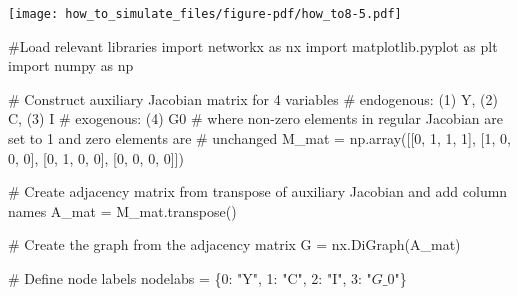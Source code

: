\documentclass[
  letterpaper,
  DIV=11,
  numbers=noendperiod]{scrreprt}
\newenvironment{Shaded}{\begin{snugshade}}{\end{snugshade}}
\newcommand{\CommentTok}[1]{\textcolor[rgb]{0.37,0.37,0.37}{#1}}
\newcommand{\DecValTok}[1]{\textcolor[rgb]{0.68,0.00,0.00}{#1}}
\newcommand{\ImportTok}[1]{\textcolor[rgb]{0.00,0.46,0.62}{#1}}
\newcommand{\NormalTok}[1]{\textcolor[rgb]{0.00,0.23,0.31}{#1}}
\newcommand{\OperatorTok}[1]{\textcolor[rgb]{0.37,0.37,0.37}{#1}}
\newcommand{\StringTok}[1]{\textcolor[rgb]{0.13,0.47,0.30}{#1}}
\begin{document}
\texttt{[image: how\_to\_simulate\_files/figure-pdf/how\_to8-5.pdf]}

\begin{tcolorbox}[enhanced jigsaw, titlerule=0mm, breakable, bottomrule=.15mm, toprule=.15mm, colbacktitle=quarto-callout-note-color!10!white, rightrule=.15mm, toptitle=1mm, opacityback=0, left=2mm, coltitle=black, title=\textcolor{quarto-callout-note-color}{\faInfo}\hspace{0.5em}{Python code}, colframe=quarto-callout-note-color-frame, opacitybacktitle=0.6, leftrule=.75mm, bottomtitle=1mm, arc=.35mm, colback=white]

\begin{Shaded}
\begin{Highlighting}[]
\CommentTok{\#Load relevant libraries}
\ImportTok{import}\NormalTok{ networkx }\ImportTok{as}\NormalTok{ nx}
\ImportTok{import}\NormalTok{ matplotlib.pyplot }\ImportTok{as}\NormalTok{ plt}
\ImportTok{import}\NormalTok{ numpy }\ImportTok{as}\NormalTok{ np}

\CommentTok{\# Construct auxiliary Jacobian matrix for 4 variables}
  \CommentTok{\# endogenous: (1) Y, (2) C, (3) I}
  \CommentTok{\# exogenous: (4) G0}
\CommentTok{\# where non{-}zero elements in regular Jacobian are set to 1 and zero elements are}
\CommentTok{\# unchanged}
\NormalTok{M\_mat }\OperatorTok{=}\NormalTok{ np.array([[}\DecValTok{0}\NormalTok{, }\DecValTok{1}\NormalTok{, }\DecValTok{1}\NormalTok{, }\DecValTok{1}\NormalTok{],}
\NormalTok{         [}\DecValTok{1}\NormalTok{, }\DecValTok{0}\NormalTok{, }\DecValTok{0}\NormalTok{, }\DecValTok{0}\NormalTok{],}
\NormalTok{         [}\DecValTok{0}\NormalTok{, }\DecValTok{1}\NormalTok{, }\DecValTok{0}\NormalTok{, }\DecValTok{0}\NormalTok{],}
\NormalTok{         [}\DecValTok{0}\NormalTok{, }\DecValTok{0}\NormalTok{, }\DecValTok{0}\NormalTok{, }\DecValTok{0}\NormalTok{]])}

\CommentTok{\# Create adjacency matrix from transpose of auxiliary Jacobian and add column names}
\NormalTok{A\_mat }\OperatorTok{=}\NormalTok{ M\_mat.transpose()}

\CommentTok{\# Create the graph from the adjacency matrix}
\NormalTok{G }\OperatorTok{=}\NormalTok{ nx.DiGraph(A\_mat)}

\CommentTok{\# Define node labels}
\NormalTok{nodelabs }\OperatorTok{=}\NormalTok{ \{}\DecValTok{0}\NormalTok{: }\StringTok{"Y"}\NormalTok{, }\DecValTok{1}\NormalTok{: }\StringTok{"C"}\NormalTok{, }\DecValTok{2}\NormalTok{: }\StringTok{"I"}\NormalTok{, }\DecValTok{3}\NormalTok{: }\StringTok{"$G\_0$"}\NormalTok{\}}


\end{Highlighting}
\end{Shaded}
\end{tcolorbox}
\end{document}
